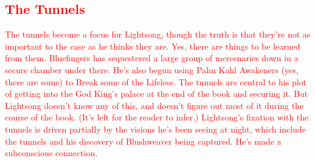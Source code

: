 \textcolor{red}{
\subsection*{The Tunnels}
}
\textcolor{red}{
The tunnels become a focus for Lightsong, though the truth is that they’re not as important to the case as he thinks they are. Yes, there are things to be learned from them. Bluefingers has sequestered a large group of mercenaries down in a secure chamber under there. He’s also begun using Pahn Kahl Awakeners (yes, there are some) to Break some of the Lifeless. The tunnels are central to his plot of getting into the God King’s palace at the end of the book and securing it.
}
\textcolor{red}{
But Lightsong doesn’t know any of this, and doesn’t figure out most of it during the course of the book. (It’s left for the reader to infer.) Lightsong’s fixation with the tunnels is driven partially by the visions he’s been seeing at night, which include the tunnels and his discovery of Blushweaver being captured. He’s made a subconscious connection.
}


